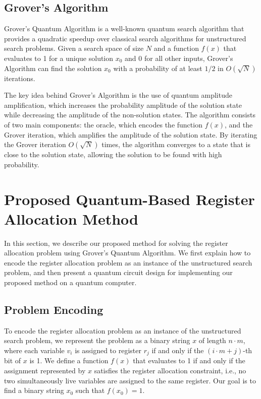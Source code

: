 \subsection{Grover's Algorithm}

Grover's Quantum Algorithm \cite{grover1996} is a well-known quantum search algorithm that provides a quadratic speedup over classical search algorithms for unstructured search problems. Given a search space of size $N$ and a function $f(x)$ that evaluates to 1 for a unique solution $x_0$ and 0 for all other inputs, Grover's Algorithm can find the solution $x_0$ with a probability of at least $1/2$ in $O(\sqrt{N})$ iterations.

The key idea behind Grover's Algorithm is the use of quantum amplitude amplification, which increases the probability amplitude of the solution state while decreasing the amplitude of the non-solution states. The algorithm consists of two main components: the oracle, which encodes the function $f(x)$, and the Grover iteration, which amplifies the amplitude of the solution state. By iterating the Grover iteration $O(\sqrt{N})$ times, the algorithm converges to a state that is close to the solution state, allowing the solution to be found with high probability.

\section{Proposed Quantum-Based Register Allocation Method}

In this section, we describe our proposed method for solving the register allocation problem using Grover's Quantum Algorithm. We first explain how to encode the register allocation problem as an instance of the unstructured search problem, and then present a quantum circuit design for implementing our proposed method on a quantum computer.

\subsection{Problem Encoding}

To encode the register allocation problem as an instance of the unstructured search problem, we represent the problem as a binary string $x$ of length $n \cdot m$, where each variable $v_i$ is assigned to register $r_j$ if and only if the $(i \cdot m + j)$-th bit of $x$ is 1. We define a function $f(x)$ that evaluates to 1 if and only if the assignment represented by $x$ satisfies the register allocation constraint, i.e., no two simultaneously live variables are assigned to the same register. Our goal is to find a binary string $x_0$ such that $f(x_0) = 1$.

